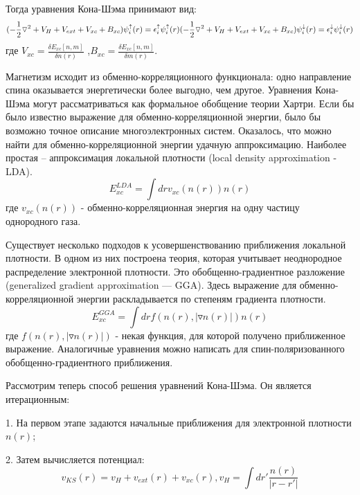 	Тогда уравнения Кона-Шэма принимают вид:
\begin{equation}
  \label{eq:equation9}
 (-\frac{1}{2}\triangledown^2+V_H+V_{ext}+V_{xc}+B_{xc})\psi_i^\uparrow(r)=\epsilon_i^\uparrow\psi_i^\uparrow(r) \\
(-\frac{1}{2}\triangledown^2+V_H+V_{ext}+V_{xc}+B_{xc})\psi_i^\downarrow(r)=\epsilon_i^\downarrow\psi_i^\downarrow(r)
 \end{equation}
где ${V_{xc}=\frac{\delta E_{xc}[n,m]}{\delta n(r)}}$ ,${B_{xc}=\frac{\delta E_{xc}[n,m]}{\delta m(r)}}$.
	
	Магнетизм исходит из обменно-корреляционного функционала: одно направление спина оказывается энергетически более выгодно, чем другое.
	Уравнения Кона-Шэма могут рассматриваться как формальное обобщение теории Хартри. Если бы было известно выражение для обменно-корреляционной энергии, было бы возможно точное описание многоэлектронных систем. Оказалось, что можно найти для обменно-корреляционной энергии удачную аппроксимацию. Наиболее простая – аппроксимация локальной плотности (local density approximation - LDA).
 	\begin{equation}
  \label{eq:equation10}
E_{xc}^{LDA}=\int drv_{xc}(n(r))n(r)
\end{equation}
где ${v_{xc}(n(r))}$ - обменно-корреляционная энергия на одну частицу однородного газа.
	
	Существует несколько подходов к усовершенствованию приближения локальной плотности. В одном из них построена теория, которая учитывает неоднородное распределение электронной плотности. Это обобщенно-градиентное разложение (generalized gradient approximation — GGA). Здесь выражение для обменно-корреляционной энергии раскладывается по степеням градиента плотности.
 	\begin{equation}
  \label{eq:equation11}
E_{xc}^{GGA}=\int drf(n(r),|\triangledown n(r)|)n(r)
\end{equation}
где ${f(n(r),|\triangledown n(r)|)}$ - некая функция, для которой получено приближенное выражение. Аналогичные уравнения можно написать для спин-поляризованного обобщенно-градиентного приближения.

	Рассмотрим теперь способ решения уравнений Кона-Шэма. Он является итерационным:

1.	На первом этапе задаются начальные приближения для электронной плотности $n(r)$;

2.	Затем вычисляется потенциал:
 	\[
v_{KS}(r)=v_H+v_{ext}(r)+v_{xc}(r), v_H=\int dr'\frac{n(r)}{|r-r'|}
\]		

